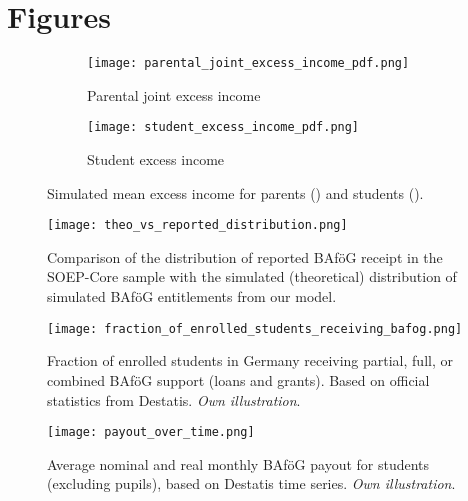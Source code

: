 \newpage
\section{Figures}
\renewcommand{\thefigure}{\thesection \arabic{figure}}
\setcounter{figure}{0}

\begin{figure}[htbp]
  \centering
  \begin{subfigure}[t]{0.48\linewidth}
    \texttt{[image: parental\_joint\_excess\_income\_pdf.png]}
    \caption{Parental joint excess income}
    \label{fig:parental-excess}
  \end{subfigure}
  \hfill
  \begin{subfigure}[t]{0.48\linewidth}
    \texttt{[image: student\_excess\_income\_pdf.png]}
    \caption{Student excess income}
    \label{fig:student-excess}
  \end{subfigure}
  \caption{Simulated mean excess income for parents () and students ().}
  \label{fig:excess-income}
\end{figure}


\begin{figure}[htbp]
  \centering
  \texttt{[image: theo\_vs\_reported\_distribution.png]}
  \caption{Comparison of the distribution of reported BAföG receipt in the SOEP-Core sample with the simulated (theoretical) distribution of simulated BAföG entitlements from our model.}
  \label{fig:theo-vs-reported}
\end{figure}


\begin{figure}[H]
  \centering

  \begin{minipage}[t]{0.48\textwidth}
    \centering
    \texttt{[image: fraction\_of\_enrolled\_students\_receiving\_bafog.png]}
    \caption{
      Fraction of enrolled students in Germany receiving partial, full, or combined BAföG support (loans and grants). Based on official statistics from Destatis. \textit{Own illustration}.
    }
    \label{figure:bafoeg_support}
  \end{minipage}%
  \hfill
  \begin{minipage}[t]{0.48\textwidth}
    \centering
    \texttt{[image: payout\_over\_time.png]}
    \caption{
      Average nominal and real monthly BAföG payout for students (excluding pupils), based on Destatis time series. \textit{Own illustration}.
    }
    \label{figure:payout_over_time}
  \end{minipage}

\end{figure}

